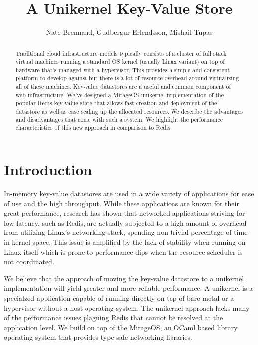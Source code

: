 \documentclass[english,10pt,twocolumn]{article}
\begin{document}
\title{A Unikernel Key-Value Store}
\author{Nate Brennand, Gudbergur Erlendsson, Mishail Tupas}
\date{}
\maketitle
\thispagestyle{empty}

\begin{abstract}
  Traditional cloud infrastructure models typically consists of a cluster of full stack virtual machines running a standard OS kernel (usually Linux variant) on top of hardware that's managed with a hypervisor. This provides a simple and consistent platform to develop against but there is a lot of resource overhead around virtualizing all of these machines.
  Key-value datastores are a useful and common component of web infrastructure.
  We've designed a MirageOS\cite{mirage} unikernel implementation of the popular Redis\cite{redis} key-value store that allows fast creation and deployment of the datastore as well as ease scaling up the allocated resources.
  We describe the advantages and disadvantages that come with such a system.
  We highlight the performance characteristics of this new approach in comparison to Redis.
\end{abstract}

\section{Introduction}
In-memory key-value datastores are used in a wide variety of applications for ease of use and the high throughput.
While these applications are known for their great performance, research has shown that networked applications striving for low latency, such as Redis, are actually subjected to a high amount of overhead from utilizing Linux's networking stack, spending non trivial percentage of time in kernel space.\cite{arrakis}
This issue is amplified by the lack of stability when running on Linux itself which is prone to performance dips when the resource scheduler is not coordinated.

We believe that the approach of moving the key-value datastore to a unikernel implementation will yield greater and more reliable performance.
A unikernel is a specialzed application capable of running directly on top of bare-metal or a hypervisor without a host operating system.
The unikernel approach lacks many of the performance issues plaguing Redis that cannot be resolved at the application level.
We build on top of the MirageOS\cite{mirage}, an OCaml based library operating system that provides type-safe networking libraries.
\end{document}
